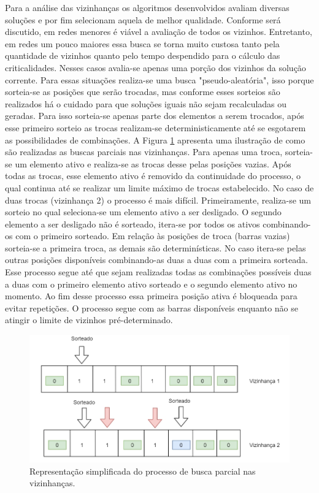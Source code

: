 \documentclass[12pt]{article}
\begin{document}
Para a análise das vizinhanças os algoritmos desenvolvidos avaliam diversas soluções e por fim selecionam aquela de melhor qualidade. Conforme será discutido, em redes menores é viável a avaliação de todos os vizinhos. Entretanto, em redes um pouco maiores essa busca se torna muito custosa tanto pela quantidade de vizinhos quanto pelo tempo despendido para o cálculo das criticalidades. Nesses casos avalia-se apenas uma porção dos vizinhos da solução corrente. Para essas situações realiza-se uma busca "pseudo-aleatória", isso porque sorteia-se as posições que serão trocadas, mas conforme esses sorteios são realizados há o cuidado para que soluções iguais não sejam recalculadas ou geradas. Para isso sorteia-se apenas parte dos elementos a serem trocados, após esse primeiro sorteio as trocas realizam-se deterministicamente até se esgotarem as possibilidades de combinações. A Figura \ref{fig10} apresenta uma ilustração de como são realizadas as buscas parciais nas vizinhanças. Para apenas uma troca, sorteia-se um elemento ativo e realiza-se as trocas desse pelas posições vazias. Após todas as trocas, esse elemento ativo é removido da continuidade do processo, o qual continua até se realizar um limite máximo de trocas estabelecido. No caso de duas trocas (vizinhança 2) o processo é mais difícil. Primeiramente, realiza-se um sorteio no qual seleciona-se um elemento ativo a ser desligado. O segundo elemento a ser desligado não é sorteado, itera-se por todos os ativos combinando-os com o primeiro sorteado. Em relação às posições de troca (barras vazias) sorteia-se a primeira troca, as demais são determinísticas. No caso itera-se pelas outras posições disponíveis combinando-as duas a duas com a primeira sorteada. Esse processo segue até que sejam realizadas todas as combinações possíveis duas a duas com o primeiro elemento ativo sorteado e o segundo elemento ativo no momento. Ao fim desse processo essa primeira posição ativa é bloqueada para evitar repetições. O processo segue com as barras disponíveis enquanto não se atingir o limite de vizinhos pré-determinado.

\begin{figure}[H]
	\centering 
	\includegraphics[scale=0.6]{figuras/Vizinhancas.jpg}
	\caption{Representação simplificada do processo de busca parcial nas vizinhanças.}
	\label{fig10} %
\end{figure}
\end{document}
